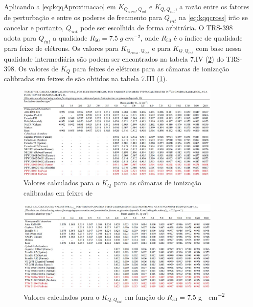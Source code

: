 \documentclass[11pt,a4paper]{article}
\begin{document}
		Aplicando a \ref{eq:kqqAproximacao} em  $K_{Q_{cross},Q_{int}}$ e $K_{Q,Q_{int}}$, a razão entre os fatores de perturbação e entre os poderes de freamento para $Q_{int}$ na \ref{eq:kqqcross} irão se cancelar e portanto, $Q_{int}$ pode ser escolhida de forma arbitrária. O TRS-398 adota para $Q_{int}$ a qualidade $R_{50} = 7.5 \; g \; cm^{-2}$, onde $R_{50}$ é o índice de qualidade para feixe de elétrons. Os valores para $K_{Q_{cross},Q_{int}}$ e para  $K_{Q,Q_{int}}$ com base nessa qualidade intermediária são podem ser encontrados na tabela 7.IV (\ref{fig:tabela74trs398}) do TRS-398. Os valores de $K_Q$ para feixes de elétrons para as câmaras de ionização calibradas em feixes de  são obtidos na tabela 7.III (\ref{fig:tabela73trs398}).

		\begin{figure}[h]
			\centering
			\includegraphics[width=0.9\textwidth]{Imagens/tabela73trs398.JPG}
			\caption{Valores calculados para o $K_Q$ para as câmaras de ionização calibradas em feixes de  }
			\label{fig:tabela73trs398}
		\end{figure}

		\begin{figure}[h]
			\centering
			\includegraphics[width=0.9\textwidth]{Imagens/tabela74trs398.JPG}
			\caption{Valores calculados para o $K_{Q,Q_{int}}$ em função do $R_{50}$ = 7.5 \unit{g \cdot cm^{-2}} }
			\label{fig:tabela74trs398}
		\end{figure}
 
\end{document}

